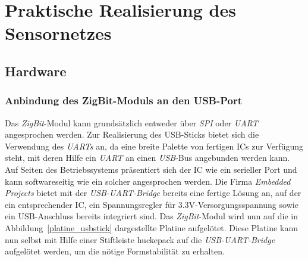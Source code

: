 
\chapter{Praktische Realisierung des Sensornetzes}

\section{Hardware}
\subsection{Anbindung des ZigBit-Moduls an den USB-Port}
Das \emph{ZigBit}-Modul kann grundsätzlich entweder über \emph{SPI} oder \emph{UART} angesprochen werden. 
Zur Realisierung des USB-Sticks bietet sich die Verwendung des \emph{UARTs} an, da eine breite Palette 
von fertigen ICs zur Verfügung steht, mit deren Hilfe ein \emph{UART} an einen \emph{USB}-Bus angebunden werden 
kann. Auf Seiten des Betriebssystems präsentiert sich der IC wie ein serieller Port und kann softwareseitig
wie ein solcher angesprochen werden. Die Firma \emph{Embedded Projects} bietet mit der \emph{USB-UART-Bridge}
bereits eine fertige Lösung an, auf der ein entsprechender IC, ein Spannungsregler für 3.3V-Versorgungsspannung
sowie ein USB-Anschluss bereits integriert sind. Das \emph{ZigBit}-Modul wird nun auf die in 
Abbildung~\ref{platine_usbstick} dargestellte Platine aufgelötet. Diese Platine kann nun selbst mit Hilfe einer
Stiftleiste huckepack auf die \emph{USB-UART-Bridge} aufgelötet werden, um die nötige Formstabilität zu erhalten.

